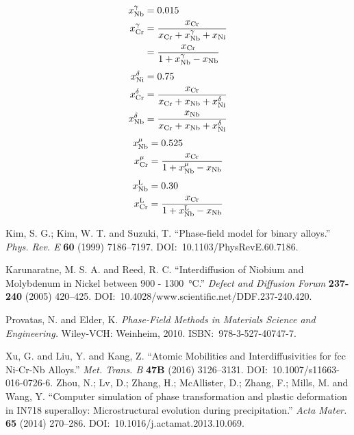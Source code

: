 \documentclass[10pt]{article}
\begin{document}
		\begin{align*}
			x_{\ce{Nb}}^{\gamma} &= 0.015\\
			x_{\ce{Cr}}^{\gamma} &= \frac{x_{\ce{Cr}}}{x_{\ce{Cr}} + x_{\ce{Nb}}^{\gamma} + x_{\ce{Ni}}}\\
			                                      &= \frac{x_{\ce{Cr}}}{1 + x_{\ce{Nb}}^{\gamma} - x_{\ce{Nb}}} 
		\end{align*}
		\begin{align*}
			x_{\ce{Ni}}^{\delta} &= 0.75\\
			x_{\ce{Cr}}^{\delta} &= \frac{x_{\ce{Cr}}}{x_{\ce{Cr}} + x_{\ce{Nb}} + x_{\ce{Ni}}^{\delta}}\\
			x_{\ce{Nb}}^{\delta} &= \frac{x_{\ce{Nb}}}{x_{\ce{Cr}} + x_{\ce{Nb}} + x_{\ce{Ni}}^{\delta}}
		\end{align*}
		\begin{align*}
			x_{\ce{Nb}}^{\mu}    &= 0.525\\
			x_{\ce{Cr}}^{\mu}    &= \frac{x_{\ce{Cr}}}{1 + x_{\ce{Nb}}^{\mu} - x_{\ce{Nb}}}
		\end{align*}
		\begin{align*}
			x_{\ce{Nb}}^{\ce{L}} &= 0.30\\
			x_{\ce{Cr}}^{\ce{L}} &= \frac{x_{\ce{Cr}}}{1 + x_{\ce{Nb}}^{\ce{L}} - x_{\ce{Nb}}}
		\end{align*}

	\begin{thebibliography}{1}
		 Kim, S. G.; Kim, W. T. and Suzuki, T.
		                  ``Phase-field model for binary alloys.''
		                  \emph{Phys. Rev. E} \textbf{60} (1999) 7186--7197.
		                  DOI:~10.1103/PhysRevE.60.7186.

		 Karunaratne, M. S. A. and Reed, R. C.
		                          ``Interdiffusion of Niobium and Molybdenum in Nickel between 900 - \SI{1300}{\degreeCelsius}.''
		                          \emph{Defect and Diffusion Forum} \textbf{237-240} (2005) 420--425.
		                          DOI:~10.4028/www.scientific.net/DDF.237-240.420.

		 Provatas, N. and Elder, K.
		                       \emph{Phase-Field Methods in Materials Science and Engineering.}
		                       Wiley-VCH: Weinheim, 2010.
		                       ISBN:~978-3-527-40747-7.

		 Xu, G. and Liu, Y. and Kang, Z.
		                          ``Atomic Mobilities and Interdiffusivities for fcc Ni-Cr-Nb Alloys.''
		                          \emph{Met. Trans. B} \textbf{47B} (2016) 3126--3131.
		                          DOI:~10.1007/s11663-016-0726-6.
		 Zhou, N.; Lv, D.; Zhang, H.; McAllister, D.; Zhang, F.; Mills, M. and Wang, Y.
		                   ``Computer simulation of phase transformation and plastic deformation in IN718 superalloy: Microstructural evolution during precipitation.''
		                   \emph{Acta Mater.} \textbf{65} (2014) 270--286.
		                   DOI:~10.1016/j.actamat.2013.10.069.
	\end{thebibliography}
\end{document}
